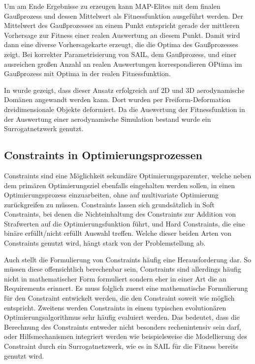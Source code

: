 Um am Ende Ergebnisse zu erzeugen kann MAP-Elites mit dem finalen Gaußprozess und dessen Mittelwert als Fitnessfunktion ausgeführt werden.
Der Mittelwert des Gaußprozesses an einem Punkt entspricht gerade der mittleren Vorhersage zur Fitness einer realen Auswertung an diesem Punkt.
Damit wird dann eine diverse Vorhersagekarte erzeugt, die die Optima des Gaußprozesses zeigt.
Bei korrekter Parametrisierung von SAIL, dem Gaußprozess, und einer ausreichen großen Anzahl an realen Auswertungen korrespondieren OPtima im Gaußprozess mit Optima in der realen Fitnessfunktion.

In \cite{Gaier.6152018} wurde gezeigt, dass dieser Ansatz erfolgreich auf 2D und 3D aerodynamische Domänen angewandt werden kann.
Dort wurden per Freiform-Deformation dreidimensionale Objekte deformiert.
Da die Auswertung der Fitnessfunktion in der Auswertung einer aerodynamische Simulation bestand wurde ein Surrogatnetzwerk genutzt.


\subsection{Constraints in Optimierungsprozessen}
Constraints sind eine Möglichkeit sekundäre Optimierungsparemter, welche neben dem primären Optimierungsziel ebenfalls eingehalten werden sollen, in einen Optimierungsprozess einzuarbeiten, ohne auf multivariate Optimierung zurückgreifen zu müssen.
Constraints lassen sich grundsätzlich in Soft Constraints, bei denen die Nichteinhaltung des Constraints zur Addition von Strafwerten auf die Optimierungsfunktion führt, und Hard Constraints, die eine binäre erfüllt/nicht erfüllt Auswahl treffen.
Welche dieser beiden Arten von Constraints genutzt wird, hängt stark von der Problemstellung ab.

Auch stellt die Formulierung von Constraints häufig eine Herausforderung dar.
So müssen diese offensichtlich berechenbar sein, Constraints sind allerdings häufig nicht in mathematischer Form formuliert sondern eher in einer Art die an Requirements erinnert.
Es muss folglich zuerst eine mathematische Formulierung für den Constraint entwickelt werden, die den Constraint soweit wie möglich entspricht.
Zweitens werden Constraints in einem typischen evolutionären Optimierungsalgorithmus sehr häufig evaluiert werden. Das bedeutet, dass die Berechnung des Constraints entweder nicht besonders rechenintensiv sein darf, oder Hilfsmechanismen integriert werden wie beispielsweise die Modellierung des Constraint durch ein Surrogatnetzwerk, wie es in SAIL für die Fitness bereits genutzt wird.

